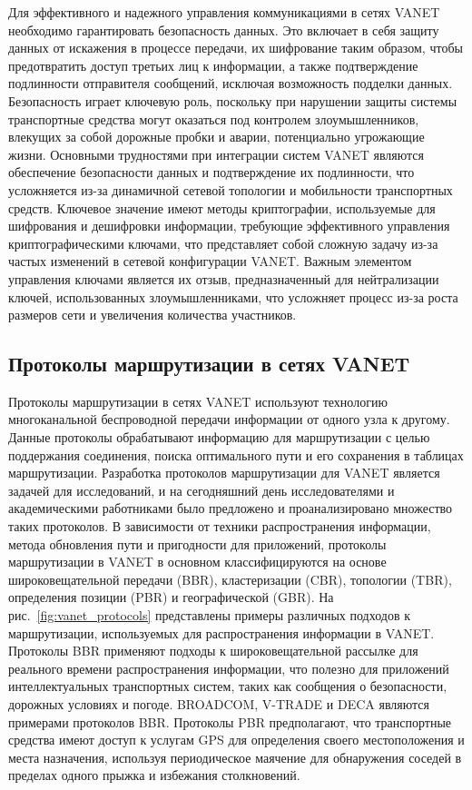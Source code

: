 Для эффективного и надежного управления коммуникациями в сетях VANET необходимо гарантировать безопасность данных. Это включает в себя защиту данных от искажения в процессе передачи, их шифрование таким образом, чтобы предотвратить доступ третьих лиц к информации, а также подтверждение подлинности отправителя сообщений, исключая возможность подделки данных. Безопасность играет ключевую роль, поскольку при нарушении защиты системы транспортные средства могут оказаться под контролем злоумышленников, влекущих за собой дорожные пробки и аварии, потенциально угрожающие жизни. Основными трудностями при интеграции систем VANET являются обеспечение безопасности данных и подтверждение их подлинности, что усложняется из-за динамичной сетевой топологии и мобильности транспортных средств. Ключевое значение имеют методы криптографии, используемые для шифрования и дешифровки информации, требующие эффективного управления криптографическими ключами, что представляет собой сложную задачу из-за частых изменений в сетевой конфигурации VANET. Важным элементом управления ключами является их отзыв, предназначенный для нейтрализации ключей, использованных злоумышленниками, что усложняет процесс из-за роста размеров сети и увеличения количества участников.


\subsection*{Протоколы маршрутизации в сетях VANET}

Протоколы маршрутизации в сетях VANET используют технологию многоканальной беспроводной передачи информации от одного узла к другому. Данные протоколы обрабатывают информацию для маршрутизации с целью поддержания соединения, поиска оптимального пути и его сохранения в таблицах маршрутизации. Разработка протоколов маршрутизации для VANET является задачей для исследований, и на сегодняшний день исследователями и академическими работниками было предложено и проанализировано множество таких протоколов. В зависимости от техники распространения информации, метода обновления пути и пригодности для приложений, протоколы маршрутизации в VANET в основном классифицируются на основе широковещательной передачи (BBR), кластеризации (CBR), топологии (TBR), определения позиции (PBR) и географической (GBR). На рис.~\ref{fig:vanet_protocols} представлены примеры различных подходов к маршрутизации, используемых для распространения информации в VANET. Протоколы BBR применяют подходы к широковещательной рассылке для реального времени распространения информации, что полезно для приложений интеллектуальных транспортных систем, таких как сообщения о безопасности, дорожных условиях и погоде. BROADCOM, V-TRADE и DECA являются примерами протоколов BBR. Протоколы PBR предполагают, что транспортные средства имеют доступ к услугам GPS для определения своего местоположения и места назначения, используя периодическое маячение для обнаружения соседей в пределах одного прыжка и избежания столкновений.~\cite{karunakar2020analysis}

